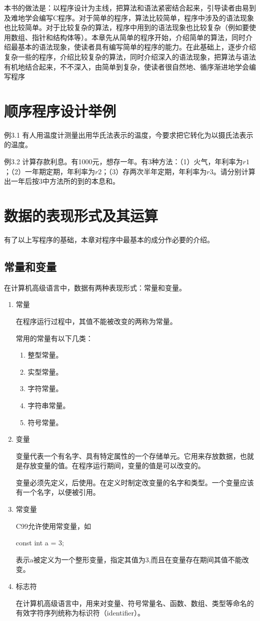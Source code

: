 本书的做法是：以程序设计为主线，把算法和语法紧密结合起来，引导读者由易到及难地学会编写C程序。对于简单的程序，算法比较简单，程序中涉及的语法现象也比较简单。对于比较复杂的算法，程序中用到的语法现象也比较复杂（例如要使用数组、指针和结构体等）。本章先从简单的程序开始，介绍简单的算法，同时介绍最基本的语法现象，使读者具有编写简单的程序的能力。在此基础上，逐步介绍复杂一些的程序，介绍比较复杂的算法，同时介绍深入的语法现象，把算法与语法有机地结合起来，不不深入，由简单到复杂，使读者很自然地、循序渐进地学会编写程序
\section{顺序程序设计举例}
例3.1 有人用温度计测量出用华氏法表示的温度，今要求把它转化为以摄氏法表示的温度。

例3.2 计算存款利息。有1000元，想存一年。有3种方法：（1）火气，年利率为$r1$；（2）一年期定期，年利率为$r2$；（3）存两次半年定期，年利率为$r3$。请分别计算出一年后按3中方法所的到的本息和。
\section{数据的表现形式及其运算}
有了以上写程序的基础，本章对程序中最基本的成分作必要的介绍。
\subsection{常量和变量}
在计算机高级语言中，数据有两种表现形式：常量和变量。
\begin{enumerate}
	\item 常量

		在程序运行过程中，其值不能被改变的两称为常量。

		常用的常量有以下几类：
		\begin{enumerate}
			\item 整型常量。
			\item 实型常量。
			\item 字符常量。
			\item 字符串常量。
			\item 符号常量。
		\end{enumerate}
	\item 变量

		变量代表一个有名字、具有特定属性的一个存储单元。它用来存放数据，也就是存放变量的值。在程序运行期间，变量的值是可以改变的。

		变量必须先定义，后使用。在定义时制定改变量的名字和类型。一个变量应该有一个名字，以便被引用。
	\item 常变量

		C99允许使用常变量，如
		\begin{lslisting}
			const int a = 3;
		\end{lslisting}
		表示a被定义为一个整形变量，指定其值为3,而且在变量存在期间其值不能改变。
	\item 标志符

		在计算机高级语言中，用来对变量、符号常量名、函数、数组、类型等命名的有效字符序列统称为标识符（identifier）。
\end{enumerate}
